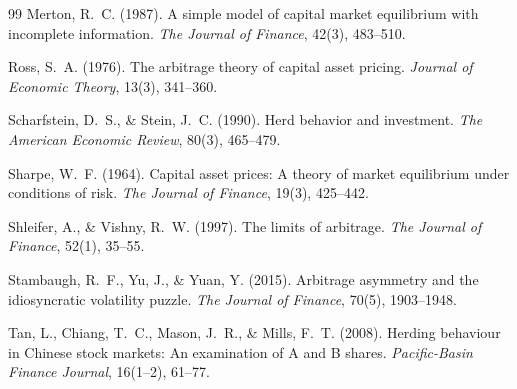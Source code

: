 \documentclass[12pt, a4paper]{article}
\begin{document}
\begin{thebibliography}{99}
Merton, R.~C. (1987).
\newblock A simple model of capital market equilibrium with incomplete information.
\newblock \textit{The Journal of Finance}, 42(3), 483--510.

Ross, S.~A. (1976).
\newblock The arbitrage theory of capital asset pricing.
\newblock \textit{Journal of Economic Theory}, 13(3), 341--360.

Scharfstein, D.~S., \& Stein, J.~C. (1990).
\newblock Herd behavior and investment.
\newblock \textit{The American Economic Review}, 80(3), 465--479.

Sharpe, W.~F. (1964).
\newblock Capital asset prices: A theory of market equilibrium under conditions of risk.
\newblock \textit{The Journal of Finance}, 19(3), 425--442.

Shleifer, A., \& Vishny, R.~W. (1997).
\newblock The limits of arbitrage.
\newblock \textit{The Journal of Finance}, 52(1), 35--55.

Stambaugh, R.~F., Yu, J., \& Yuan, Y. (2015).
\newblock Arbitrage asymmetry and the idiosyncratic volatility puzzle.
\newblock \textit{The Journal of Finance}, 70(5), 1903--1948.

Tan, L., Chiang, T.~C., Mason, J.~R., \& Mills, F.~T. (2008).
\newblock Herding behaviour in Chinese stock markets: An examination of A and B shares.
\newblock \textit{Pacific-Basin Finance Journal}, 16(1--2), 61--77.

\end{thebibliography}
\end{document}
